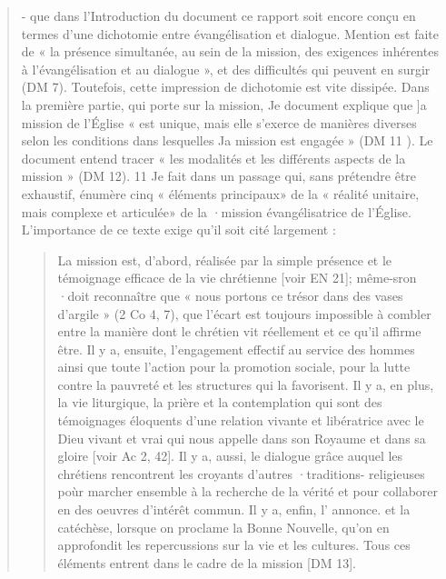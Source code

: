 \begin{quote}
- que dans l'Introduction du document ce rapport soit
encore conçu en termes d'une dichotomie entre évangélisation
et dialogue. Mention est faite de « la présence simultanée, au
sein de la mission, des exigences inhérentes à l'évangélisation
et au dialogue », et des difficultés qui peuvent en surgir (DM 7).
Toutefois, cette impression de dichotomie est vite dissipée.
Dans la première partie, qui porte sur la mission, Je document
explique que ]a mission de l'Église « est unique, mais elle
s'exerce de manières diverses selon les conditions dans lesquelles
Ja mission est engagée » (DM 11 ). Le document entend
tracer « les modalités et les différents aspects de la mission »
(DM 12). 11 Je fait dans un passage qui, sans prétendre être
exhaustif, énumère cinq « éléments principaux» de la « réalité
unitaire, mais complexe et articulée» de la ·mission évangélisatrice
de l'Église. L'importance de ce texte exige qu'il soit
cité largement :
\begin{quote}
    La mission est, d'abord, réalisée par la simple présence et le
témoignage efficace de la vie chrétienne [voir EN 21]; même-sron
·doit reconnaître que « nous portons ce trésor dans des vases d'argile
» (2 Co 4, 7), que l'écart est toujours impossible à combler entre
la manière dont le chrétien vit réellement et ce qu'il affirme être.
Il y a, ensuite, l'engagement effectif au service des hommes ainsi
que toute l'action pour la promotion sociale, pour la lutte contre la
pauvreté et les structures qui la favorisent.
Il y a, en plus, la vie liturgique, la prière et la contemplation qui
sont des témoignages éloquents d'une relation vivante et libératrice
avec le Dieu vivant et vrai qui nous appelle dans son Royaume et
dans sa gloire [voir Ac 2, 42].
Il y a, aussi, le dialogue grâce auquel les chrétiens rencontrent les
croyants d'autres ·traditions- religieuses poùr marcher ensemble à la
recherche de la vérité et pour collaborer en des oeuvres d'intérêt
commun.
Il y a, enfin, l' annonce. et la catéchèse, lorsque on proclame la
Bonne Nouvelle, qu'on en approfondit les repercussions sur la vie et
les cultures.
 Tous ces éléments entrent dans le cadre de la mission [DM 13].
\end{quote}


\end{quote}

